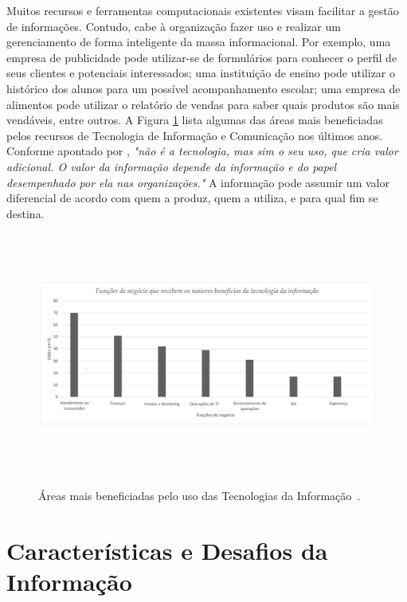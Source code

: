 Muitos recursos e ferramentas computacionais existentes visam facilitar a gestão de informações. Contudo, cabe à organização fazer uso e realizar um gerenciamento de forma inteligente da massa informacional. Por exemplo, uma empresa de publicidade pode utilizar-se de formulários para conhecer o perfil de seus clientes e potenciais interessados; uma instituição de ensino pode utilizar o histórico dos alunos para um possível acompanhamento escolar; uma empresa de alimentos pode utilizar o relatório de vendas para saber quais produtos são mais vendáveis, entre outros. A Figura \ref{areasTIC} lista algumas das áreas mais beneficiadas pelos recursos de Tecnologia de Informação e Comunicação nos últimos anos. Conforme apontado por \citet[p. 4]{mcgee1994}, \textit{"não é a tecnologia, mas sim o seu uso, que cria valor adicional. O valor da informação depende da informação e do papel desempenhado por ela nas organizações."}  A informação pode assumir um valor diferencial de acordo com quem a produz, quem a utiliza, e para qual fim se destina.
\\
\begin{figure}[!t]
	\centering
	{\includegraphics[width=15cm,height=8cm]{images/tic_finalidade}}
	\caption {Áreas mais beneficiadas pelo uso das Tecnologias da Informação~\citep{sistemas_informacao1}.}
	\label{areasTIC}
\end{figure}

\section{Características e Desafios da Informação} \label{43}

